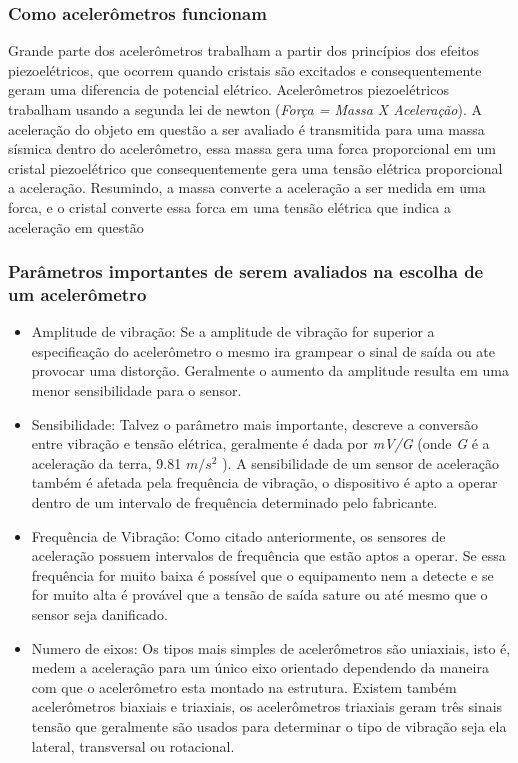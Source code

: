 \subsubsection{Como acelerômetros funcionam}
Grande parte dos acelerômetros trabalham a partir dos princípios dos efeitos piezoelétricos, que ocorrem quando cristais são excitados e consequentemente geram uma diferencia de potencial elétrico.  Acelerômetros piezoelétricos trabalham usando a segunda lei de newton (\textit{Força = Massa X Aceleração}). A aceleração do objeto em questão a ser avaliado é transmitida para uma massa sísmica dentro do acelerômetro, essa massa gera uma forca proporcional em um cristal piezoelétrico que consequentemente gera uma tensão elétrica proporcional a aceleração. Resumindo, a massa converte a aceleração a ser medida em uma forca, e o cristal converte essa forca em uma tensão elétrica que indica a aceleração em questão
\subsubsection{Parâmetros importantes de serem avaliados na escolha de um acelerômetro}
\begin{itemize}
\item Amplitude de vibração: Se a amplitude de vibração for superior a especificação do acelerômetro o mesmo ira grampear o sinal de saída ou ate provocar uma distorção. Geralmente o aumento da amplitude resulta em uma menor sensibilidade para o sensor.
\item Sensibilidade: Talvez o parâmetro mais importante, descreve a conversão entre vibração e tensão elétrica, geralmente é dada por \textit{mV/G} (onde \textit{G} é a aceleração da terra, 9.81 $m/s^2$ ). A sensibilidade de um sensor de aceleração também é afetada pela frequência de vibração, o dispositivo é apto a operar dentro de um intervalo de frequência determinado pelo fabricante.
\item Frequência de Vibração: Como citado anteriormente, os sensores de aceleração possuem intervalos de frequência que estão aptos a operar. Se essa frequência for muito baixa é possível que o equipamento nem a detecte e se for muito alta é provável que a tensão de saída sature ou até mesmo que o sensor seja danificado.
\item Numero de eixos: Os tipos mais simples de acelerômetros são uniaxiais, isto é, medem a aceleração para um único eixo orientado dependendo da maneira com que o acelerômetro esta montado na estrutura. Existem também acelerômetros biaxiais e triaxiais, os acelerômetros triaxiais geram três sinais tensão que geralmente são usados para determinar o tipo de vibração seja ela lateral, transversal ou rotacional.
\end{itemize}
